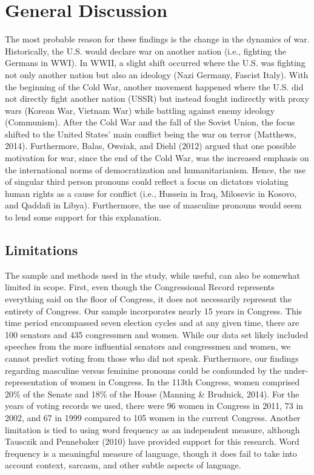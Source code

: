 \documentclass[english,man]{apa6}
\theoremstyle{definition}
\theoremstyle{definition}
\theoremstyle{definition}
\theoremstyle{remark}
\begin{document}
\section{General Discussion}\label{general-discussion}

The most probable reason for these findings is the change in the
dynamics of war. Historically, the U.S. would declare war on another
nation (i.e., fighting the Germans in WWI). In WWII, a slight shift
occurred where the U.S. was fighting not only another nation but also an
ideology (Nazi Germany, Fascist Italy). With the beginning of the Cold
War, another movement happened where the U.S. did not directly fight
another nation (USSR) but instead fought indirectly with proxy wars
(Korean War, Vietnam War) while battling against enemy ideology
(Communism). After the Cold War and the fall of the Soviet Union, the
focus shifted to the United States' main conflict being the war on
terror (Matthews, 2014). Furthermore, Balas, Owsiak, and Diehl (2012)
argued that one possible motivation for war, since the end of the Cold
War, was the increased emphasis on the international norms of
democratization and humanitarianism. Hence, the use of singular third
person pronouns could reflect a focus on dictators violating human
rights as a cause for conflict (i.e., Hussein in Iraq, Milosevic in
Kosovo, and Qaddafi in Libya). Furthermore, the use of masculine
pronouns would seem to lend some support for this explanation.

\subsection{Limitations}\label{limitations}

The sample and methods used in the study, while useful, can also be
somewhat limited in scope. First, even though the Congressional Record
represents everything said on the floor of Congress, it does not
necessarily represent the entirety of Congress. Our sample incorporates
nearly 15 years in Congress. This time period encompassed seven election
cycles and at any given time, there are 100 senators and 435 congressmen
and women. While our data set likely included speeches from the more
influential senators and congressmen and women, we cannot predict voting
from those who did not speak. Furthermore, our findings regarding
masculine versus feminine pronouns could be confounded by the
under-representation of women in Congress. In the 113th Congress, women
comprised 20\% of the Senate and 18\% of the House (Manning \& Brudnick,
2014). For the years of voting records we used, there were 96 women in
Congress in 2011, 73 in 2002, and 67 in 1999 compared to 105 women in
the current Congress. Another limitation is tied to using word frequency
as an independent measure, although Tausczik and Pennebaker (2010) have
provided support for this research. Word frequency is a meaningful
measure of language, though it does fail to take into account context,
sarcasm, and other subtle aspects of language.
\end{document}
